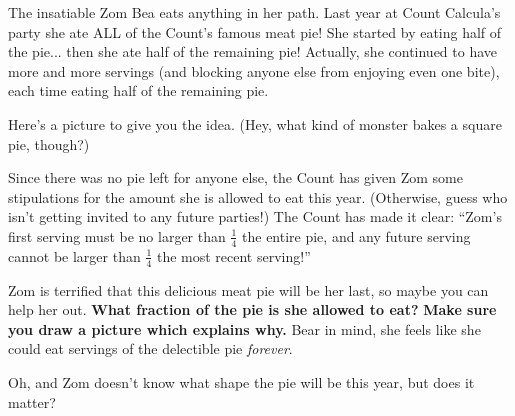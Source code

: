 


The insatiable Zom Bea eats anything in her path. Last year at Count Calcula's
party she ate ALL of the Count's famous meat pie! She started by eating half of
the pie... then she ate half of the remaining pie! Actually, she
continued to have more and more servings (and blocking anyone else
from enjoying even one bite), each time eating half of the
remaining pie.

Here's a picture to give you the idea. (Hey, what kind of monster bakes
a square pie, though?)

\begin{center}
\end{center}

Since there was no pie left for anyone else, the Count has given Zom some
stipulations for the amount she is allowed to eat this year.
(Otherwise, guess who isn't getting invited to any future parties!) The Count
has made it clear: ``Zom's first serving must be
no larger than \(\frac{1}{4}\) the entire pie, and any future serving cannot
be larger than \(\frac{1}{4}\) the most recent serving!''

Zom is terrified that this delicious meat pie will be her last, so maybe you can
help her out. \textbf{What fraction of the pie is she allowed to eat?}
\textbf{Make sure you draw a picture which explains why.}
Bear in mind, she feels like she could eat servings of the delectible
pie \textit{forever}.

Oh, and Zom doesn't know what shape the pie will be this year, but does
it matter?
